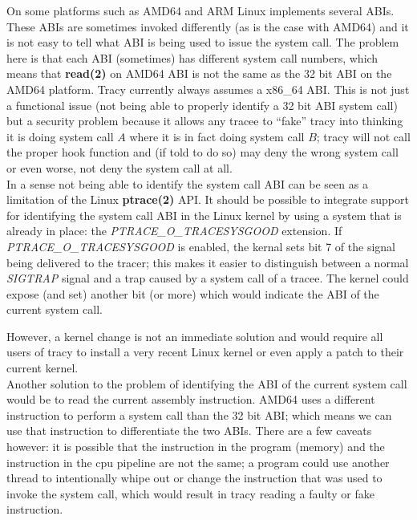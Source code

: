 \documentclass[a4paper, 10pt]{report}
\begin{document}
On some platforms such as AMD64 and ARM Linux implements several ABIs.
These ABIs are sometimes invoked differently (as is the case with AMD64)
and it is not easy to tell what ABI is being used to issue the system call.
The problem here is that each ABI (sometimes) has different system call
numbers, which means that \textbf{read(2)} on AMD64 ABI is not the same
as the 32 bit ABI on the AMD64 platform. Tracy currently always assumes
a x86\_64 ABI. This is not just a functional issue (not being able to
properly identify a 32 bit ABI system call) but a security problem because it
allows any tracee to ``fake'' tracy into thinking it is doing system call $A$
where it is in fact doing system call $B$; tracy will not call the proper hook
function and (if told to do so) may deny the wrong system call or even worse,
not deny the system call at all. \\

In a sense not being able to identify the system call ABI can be seen as a
limitation of the Linux \textbf{ptrace(2)} API. It should be possible to
integrate support for identifying the system call ABI in the Linux kernel
by using a system that is already in place: the \textit{PTRACE\_O\_TRACESYSGOOD}
extension. If \textit{PTRACE\_O\_TRACESYSGOOD} is enabled, the kernal sets bit 7
of the signal being delivered to the tracer; this makes it easier to distinguish
between a normal \textit{SIGTRAP} signal and a trap caused by a system call of
a tracee. The kernel could expose (and set) another bit (or more) which would
indicate the ABI of the current system call.

However, a kernel change is not an immediate solution and would require all
users of tracy to install a very recent Linux kernel or even apply a patch
to their current kernel. \\

Another solution to the problem of identifying the ABI of the current
system call would be to read the current assembly instruction. AMD64 uses a
different instruction to perform a system call than the 32 bit ABI; which
means we can use that instruction to differentiate the two ABIs. There are a
few caveats however: it is possible that the instruction in the program (memory)
and the instruction in the cpu pipeline are not the same; a program could use
another thread to intentionally whipe out or change the instruction that was
used to invoke the system call, which would result in tracy reading a faulty
or fake instruction. \\
\end{document}
